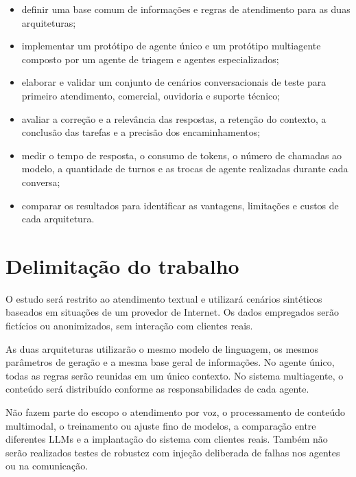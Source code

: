 \begin{itemize}
    \item definir uma base comum de informações e regras de atendimento para as duas arquiteturas;

    \item implementar um protótipo de agente único e um protótipo multiagente composto por um agente de triagem e agentes especializados;

    \item elaborar e validar um conjunto de cenários conversacionais de teste para primeiro atendimento, comercial, ouvidoria e suporte técnico;

    \item avaliar a correção e a relevância das respostas, a retenção do contexto, a conclusão das tarefas e a precisão dos encaminhamentos;

    \item medir o tempo de resposta, o consumo de tokens, o número de chamadas ao modelo, a quantidade de turnos e as trocas de agente realizadas durante cada conversa;

    \item comparar os resultados para identificar as vantagens, limitações e custos de cada arquitetura.
\end{itemize}

\section{Delimitação do trabalho}\label{sec:delimitacao}

O estudo será restrito ao atendimento textual e utilizará cenários sintéticos baseados em situações de um provedor de Internet. Os dados empregados serão fictícios ou anonimizados, sem interação com clientes reais.

As duas arquiteturas utilizarão o mesmo modelo de linguagem, os mesmos parâmetros de geração e a mesma base geral de informações. No agente único, todas as regras serão reunidas em um único contexto. No sistema multiagente, o conteúdo será distribuído conforme as responsabilidades de cada agente.

Não fazem parte do escopo o atendimento por voz, o processamento de conteúdo multimodal, o treinamento ou ajuste fino de modelos, a comparação entre diferentes LLMs e a implantação do sistema com clientes reais. Também não serão realizados testes de robustez com injeção deliberada de falhas nos agentes ou na comunicação.


